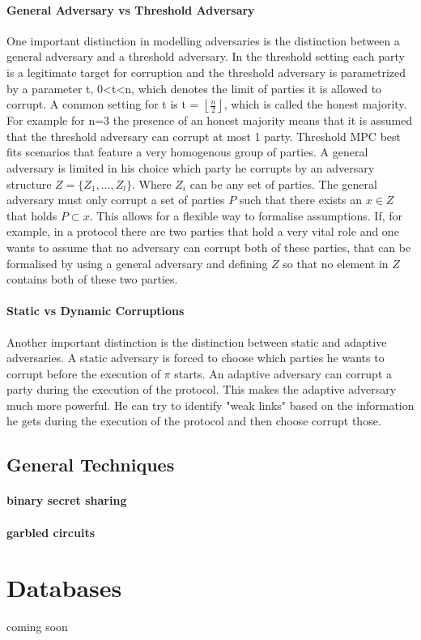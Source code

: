 \paragraph{General Adversary vs Threshold Adversary}
One important distinction in modelling adversaries is the distinction between a general adversary and a threshold adversary.
In the threshold setting each party is a legitimate target for corruption and the threshold adversary is parametrized by a parameter t, 0<t<n, which denotes the limit of parties it is allowed to corrupt. A common setting for t is t = $\left \lfloor{ \frac{n}{2} }\right \rfloor  $, which is called the honest majority. For example for n=3 the presence of an honest majority means that it is assumed that the threshold adversary can corrupt at most 1 party. Threshold MPC best fits scenarios that feature a very homogenous group of parties. A general adversary is limited in his choice which party he corrupts by an adversary structure  
$ Z = \{ Z_1, \dots, Z_l  \} $. Where $ Z_i $ can be any set of parties. The general adversary must only corrupt a set of parties  $ P $ such that there exists an $ x \in Z $ that holds $ P \subset x $. This allows for a flexible way to formalise assumptions. If, for example, in a protocol there are two parties that hold a very vital role and one wants to assume that no adversary can corrupt both of these parties, that can be formalised by using a general adversary and defining $ Z $ so that no element in  $Z $ contains both of these two parties.  
 
\paragraph{Static vs Dynamic Corruptions}
Another important distinction is the distinction between static and adaptive adversaries. A static adversary is forced to choose which parties he wants to corrupt before the execution of $ \pi $ starts. An adaptive adversary can corrupt a party during the execution of the protocol. This makes the adaptive adversary much more powerful. He can try to identify "weak links" based on the information he gets during the execution of the protocol and then choose corrupt those.   


\subsection{General Techniques}
\paragraph{binary secret sharing} 
\paragraph{garbled circuits}

\section{Databases}
\label{Databases}
coming soon